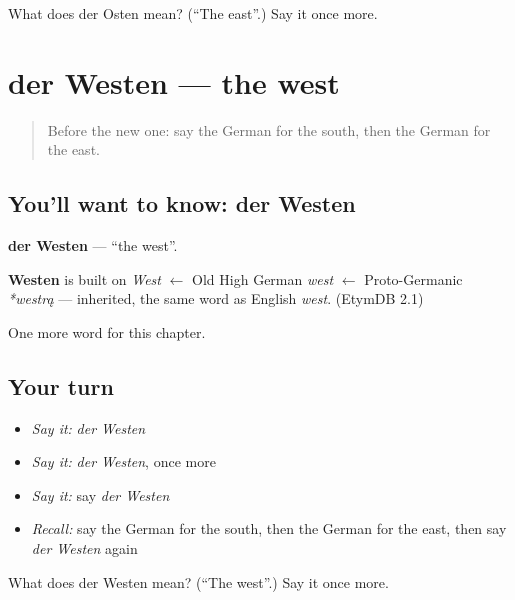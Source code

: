 \begin{tcolorbox}[breakable,colback=teal!4,colframe=teal!35!black,title={Before you move on}]
What does der Osten mean? (\textquotedblleft{}The east\textquotedblright{}.) Say it once more.
\end{tcolorbox}
\section[der Westen]{der Westen — the west}

\label{lesson:GE-C108-westen}



\begin{quote}
Before the new one: say the German for the south, then the German for the east.
\end{quote}

\subsection*{You'll want to know: der Westen}
\textbf{der Westen} — \textquotedblleft{}the west\textquotedblright{}.

\begin{cousinweb}
\textbf{Westen} is built on \emph{West} $\leftarrow$ Old High German \emph{west} $\leftarrow$ Proto-Germanic \emph{*westrą} — inherited, the same word as English \emph{west}. (EtymDB 2.1)
\end{cousinweb}

\begin{grammarlens}[title={What you've built}]
One more word for this chapter.
\end{grammarlens}

\subsection*{Your turn}
\begin{itemize}
\raggedright
  \item \emph{Say it:} \emph{der Westen}
  \item \emph{Say it:} \emph{der Westen}, once more
  \item \emph{Say it:} say \emph{der Westen}
  \item \emph{Recall:} say the German for the south, then the German for the east, then say \emph{der Westen} again
\end{itemize}

\begin{tcolorbox}[breakable,colback=teal!4,colframe=teal!35!black,title={Before you move on}]
What does der Westen mean? (\textquotedblleft{}The west\textquotedblright{}.) Say it once more.
\end{tcolorbox}
